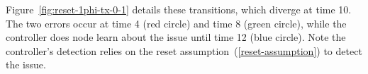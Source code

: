 Figure~\ref{fig:reset-1phi-tx-0-1} details these transitions, which diverge at
time 10. The two errors occur at time 4 (red circle) and time 8 (green
circle), while the controller does node learn about the issue until time 12
(blue circle). Note the controller's detection relies on
the reset assumption~(\ref{reset-assumption}) to detect the issue.

\begin{comment}

\begin{figure}
\begin{subfigure}{\textwidth}
    \centering
    \huge {\bf MES 0110, ACK 0110, RST 01011 Broken:}

    \tiny
    \begin{tikztimingtable}[timing/slope=.3,timing/wscale=1.0]
      Din  & L0.8L4{4L}4{4H}2{4L}0.2LLLXXHHH4H    0.5H8{2L}8{2H}8{2L}7{2H}1.5HH \\
      Dout & L0.0L4{4L}4{4H}2{4L}   LLLXXHHH4H    0.5H8{2L}8{2H}8{2L}7{2H}1.5HH \\
      ~~~~ & D{}{16D{Data 0}}{16D{Data 1}}{12D{Data 0}}{44D{Error (Forwarding)}}{28D{Reset}}D
      \\
      \\
      Din  & L3{4L}LLLXXHHH2{4H}HHHXXLLL{4L}{4L}.5L.5HHHH4H    0.8H8{2L}8{2H}8{2L}7{2H}1.2HH \\
      Dout & L3{4L}LLLXXHHH2{4H}HHHXXLLL2{4L}2{4H} HLLL8H4LLH8{2H}8{2L}7{2H}H \\
      ~~~~ & {5D{Data 0}}{32D{End Sequence}}{28D{Acknowledgement Attempt}}{32D{Error (Forwarding)}}{20D{Reset}}D \\
      Din  & L0.5L4{4L}4{4H}3{4L}{4H}3.5H HLLL8H4LLH8{2H}8{2L}7{2H}H \\
      Dout & L0.5L4{4L}4{4H}3{4L}{4H}3.5H 8{2L}8{2H}8{2L}7{2H}2.0HH \\
      CLK  & C26{2C}4L15{4C}H \\
      \extracode
        \begin{pgfonlayer}{background}
          \begin{scope}[semitransparent,dashed]
            \vertlines{1,9,...,49}
            \pgfmathparse{\twidth-4}
            \vertlines{57,65,...,\pgfmathresult}
            \vertlines[color=red]{5,13,...,49}
            \vertlines[color=blue]{53,61,...,\pgfmathresult}
            \pgfmathparse{\twidth-1}
            \vertlines{\pgfmathresult}
          \end{scope}
          \begin{scope}[thick]

\end{comment}
